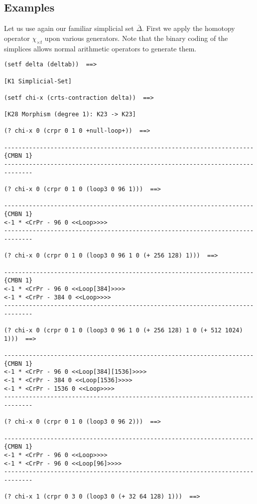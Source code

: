 \subsection* {Examples}

Let us use again our familiar simplicial set $\bar\Delta$. First we apply  the
homotopy operator $\chi_{\times t}$   upon various generators.
Note that the binary coding of the simplices
allows normal arithmetic operators to generate them.
{\footnotesize\begin{verbatim}
(setf delta (deltab))  ==>

[K1 Simplicial-Set]

(setf chi-x (crts-contraction delta))  ==>

[K28 Morphism (degree 1): K23 -> K23]

(? chi-x 0 (crpr 0 1 0 +null-loop+))  ==>

----------------------------------------------------------------------{CMBN 1}
------------------------------------------------------------------------------

(? chi-x 0 (crpr 0 1 0 (loop3 0 96 1)))  ==>

----------------------------------------------------------------------{CMBN 1}
<-1 * <CrPr - 96 0 <<Loop>>>>
------------------------------------------------------------------------------

(? chi-x 0 (crpr 0 1 0 (loop3 0 96 1 0 (+ 256 128) 1)))  ==>

----------------------------------------------------------------------{CMBN 1}
<-1 * <CrPr - 96 0 <<Loop[384]>>>>
<-1 * <CrPr - 384 0 <<Loop>>>>
------------------------------------------------------------------------------

(? chi-x 0 (crpr 0 1 0 (loop3 0 96 1 0 (+ 256 128) 1 0 (+ 512 1024) 1)))  ==>

----------------------------------------------------------------------{CMBN 1}
<-1 * <CrPr - 96 0 <<Loop[384][1536]>>>>
<-1 * <CrPr - 384 0 <<Loop[1536]>>>>
<-1 * <CrPr - 1536 0 <<Loop>>>>
------------------------------------------------------------------------------

(? chi-x 0 (crpr 0 1 0 (loop3 0 96 2)))  ==>

----------------------------------------------------------------------{CMBN 1}
<-1 * <CrPr - 96 0 <<Loop>>>>
<-1 * <CrPr - 96 0 <<Loop[96]>>>>
------------------------------------------------------------------------------

(? chi-x 1 (crpr 0 3 0 (loop3 0 (+ 32 64 128) 1)))  ==>


\end{verbatim}}
